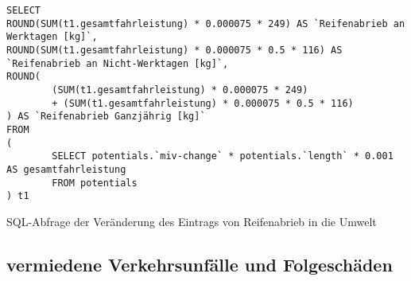 \documentclass[fontsize=12pt,a4paper]{scrreprt}
\begin{document}
\begin{listing}[htbp]
\begin{verbatim}
SELECT 
ROUND(SUM(t1.gesamtfahrleistung) * 0.000075 * 249) AS `Reifenabrieb an Werktagen [kg]`, 
ROUND(SUM(t1.gesamtfahrleistung) * 0.000075 * 0.5 * 116) AS `Reifenabrieb an Nicht-Werktagen [kg]`, 
ROUND(
        (SUM(t1.gesamtfahrleistung) * 0.000075 * 249) 
        + (SUM(t1.gesamtfahrleistung) * 0.000075 * 0.5 * 116)
) AS `Reifenabrieb Ganzjährig [kg]`
FROM
(
        SELECT potentials.`miv-change` * potentials.`length` * 0.001 AS gesamtfahrleistung
        FROM potentials
) t1
\end{verbatim}
\caption{SQL-Abfrage der Veränderung des Eintrags von Reifenabrieb in die Umwelt}\label{lst-emmissionen-reifenabrieb}
\end{listing}

\subsection{vermiedene Verkehrsunfälle und Folgeschäden}
\end{document}

